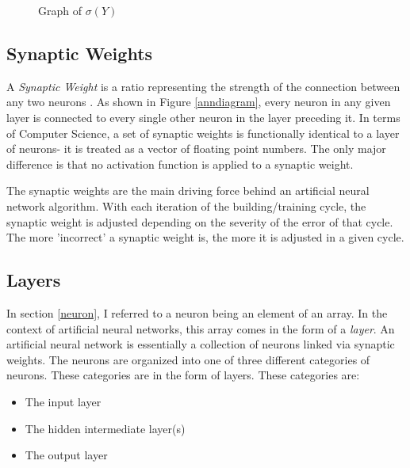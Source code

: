 \documentclass[12pt]{article}
\begin{document}
\begin{figure}[h]
  \centering
  \caption{Graph of $\sigma(Y)$} \label{sigmoidgraph}
\end{figure}

\subsection{Synaptic Weights \label{weights}}

A \textit{Synaptic Weight} is a ratio representing the strength of the connection between any two neurons \textcite{shamdasani2017}. As shown in Figure \ref{anndiagram}, every neuron in any given layer is connected to every single other neuron in the layer preceding it. In terms of Computer Science, a set of synaptic weights is functionally identical to a layer of neurons- it is treated as a vector of floating point numbers. The only major difference is that no activation function is applied to a synaptic weight.

The synaptic weights are the main driving force behind an artificial neural network algorithm. With each iteration of the building/training cycle, the synaptic weight is adjusted depending on the severity of the error of that cycle. The more 'incorrect' a synaptic weight is, the more it is adjusted in a given cycle.

\subsection{Layers}

In section \ref{neuron}, I referred to a neuron being an element of an array. In the context of artificial neural networks, this array comes in the form of a \textit{layer}. An artificial neural network is essentially a collection of neurons linked via synaptic weights. The neurons are organized into one of three different categories of neurons. These categories are in the form of layers. These categories are:

\begin{itemize}
  \item The input layer
  \item The hidden intermediate layer(s)
  \item The output layer
\end{itemize}
\end{document}
